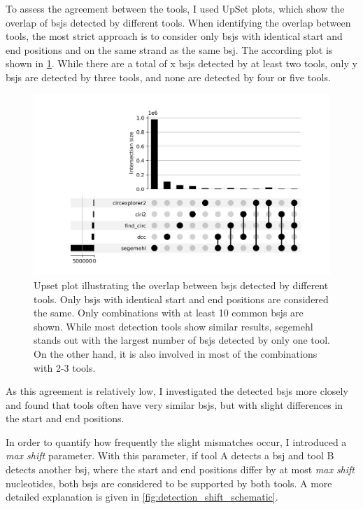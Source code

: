 To assess the agreement between the tools, I used UpSet plots, which show the
overlap of \glspl{bsj} detected by different tools.
When identifying the overlap between tools, the most strict approach is to
consider only \glspl{bsj} with identical start and end positions and on the
same strand as the same \gls{bsj}.
The according plot is shown in \cref{fig:detection_upset_0}.
While there are a total of x \glspl{bsj} detected by at least two tools, only y
\glspl{bsj} are detected by three tools, and none are detected by four or five
tools.

\begin{figure}[H]
    \centering

    \includegraphics[width=\textwidth]{chapters/4_results_and_discussion/figures/detection/upset/shift_0.png}
    \caption{Upset plot illustrating the overlap between \glspl{bsj} detected
        by
        different tools.
        Only \glspl{bsj} with identical start and end positions are considered the
        same.
        Only combinations with at least 10 common \glspl{bsj} are shown.
        While most detection tools show similar results, segemehl stands out with the
        largest number of \glspl{bsj} detected by only one tool.
        On the other hand, it is also involved in most of the combinations with 2-3
        tools.
    } \label{fig:detection_upset_0} \end{figure}

As this agreement is relatively low, I investigated the detected \glspl{bsj}
more closely and found that tools often have very similar \glspl{bsj}, but with
slight differences in the start and end positions.

In order to quantify how frequently the slight mismatches occur, I introduced a
\textit{max shift} parameter.
With this parameter, if tool A detects a \gls{bsj} and tool B detects another
\gls{bsj}, where the start and end positions differ by at most \textit{max
    shift} nucleotides, both \glspl{bsj} are considered to be supported by both
tools.
A more detailed explanation is given in \cref{fig:detection_shift_schematic}.

